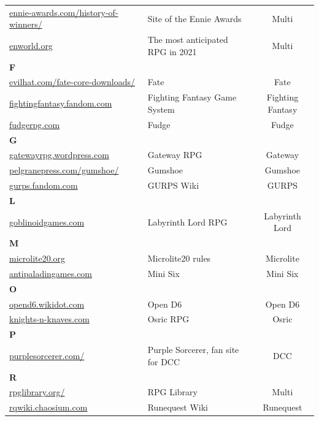 \documentclass[a4paper, 11pt, twoside]{article}
\begin{document}
\begin{longtable}{llc}
\href{https://ennie-awards.com/history-of-winners/}{ennie-awards.com/history-of-winners/} & Site of the Ennie Awards & Multi\\
\href{https://www.enworld.org/threads/the-10-most-anticipated-tabletop-rpgs-of-2021.677397/}{enworld.org} & The most anticipated RPG in 2021 & Multi\\
\textbf{F} &  & \\
\href{https://www.evilhat.com/home/fate-core-downloads/}{evilhat.com/fate-core-downloads/} & Fate & Fate\\
\href{https://fightingfantasy.fandom.com/wiki/Game\_System}{fightingfantasy.fandom.com} & Fighting Fantasy Game System & Fighting Fantasy\\
\href{https://fudgerpg.com/goodies/fudge-files.html}{fudgerpg.com} & Fudge & Fudge\\
\textbf{G} &  & \\
\href{https://gatewayrpg.wordpress.com}{gatewayrpg.wordpress.com} & Gateway RPG & Gateway\\
\href{https://site.pelgranepress.com/index.php/gumshoe/}{pelgranepress.com/gumshoe/} & Gumshoe & Gumshoe\\
\href{https://gurps.fandom.com/wiki/Main\_Page}{gurps.fandom.com} & GURPS Wiki & GURPS\\
\textbf{L} &  & \\
\href{https://goblinoidgames.com/index.php/downloads/}{goblinoidgames.com} & Labyrinth Lord RPG & Labyrinth Lord\\
\textbf{M} &  & \\
\href{https://microlite20.org/community/viewforum.php?f=15}{microlite20.org} & Microlite20 rules & Microlite\\
\href{http://www.antipaladingames.com/}{antipaladingames.com} & Mini Six & Mini Six\\
\textbf{O} &  & \\
\href{http://opend6.wikidot.com/}{opend6.wikidot.com} & Open D6 & Open D6\\
\href{https://www.knights-n-knaves.com}{knights-n-knaves.com} & Osric RPG & Osric\\
\textbf{P} &  & \\
\href{https://purplesorcerer.com/}{purplesorcerer.com/} & Purple Sorcerer, fan site for DCC & DCC\\
\textbf{R} &  & \\
\href{https://www.rpglibrary.org/}{rpglibrary.org/} & RPG Library & Multi\\
\href{https://rqwiki.chaosium.com/}{rqwiki.chaosium.com} & Runequest Wiki & Runequest\\

\end{longtable}
\end{document}
